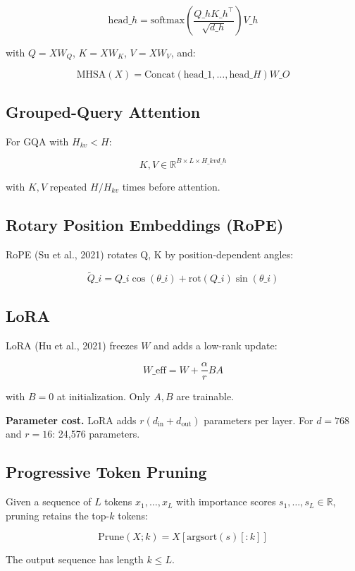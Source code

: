 \[
\text{head}\_h = \text{softmax}\!\left(\frac{Q\_h K\_h^\top}{\sqrt{d\_h}}\right) V\_h
\tag{3.1}
\]

with $Q = X W_Q$, $K = X W_K$, $V = X W_V$, and:

\[
\text{MHSA}(X) = \text{Concat}(\text{head}\_1, \dots, \text{head}\_H) W\_O
\tag{3.2}
\]

\subsection{Grouped-Query Attention}

For GQA with $H_{kv} < H$:

\[
K, V \in \mathbb{R}^{B \times L \times H\_{kv} d\_h}
\tag{3.3}
\]

with $K, V$ repeated $H / H_{kv}$ times before attention.

\subsection{Rotary Position Embeddings (RoPE)}

RoPE (Su et al., 2021) rotates Q, K by position-dependent angles:

\[
\tilde{Q}\_i = Q\_i \cos(\theta\_i) + \text{rot}(Q\_i) \sin(\theta\_i)
\tag{3.4}
\]

\subsection{LoRA}

LoRA (Hu et al., 2021) freezes $W$ and adds a low-rank update:

\[
W\_\text{eff} = W + \frac{\alpha}{r} B A
\tag{3.5}
\]

with $B = 0$ at initialization. Only $A, B$ are trainable.

\textbf{Parameter cost.} LoRA adds $r(d_\text{in} + d_\text{out})$ parameters 
per layer. For $d = 768$ and $r = 16$: 24,576 parameters.

\subsection{Progressive Token Pruning}

Given a sequence of $L$ tokens $x_1, \dots, x_L$ with importance scores 
$s_1, \dots, s_L \in \mathbb{R}$, pruning retains the top-$k$ tokens:

\[
\text{Prune}(X; k) = X[\text{argsort}(s)[:k]]
\tag{3.6}
\]

The output sequence has length $k \leq L$.

